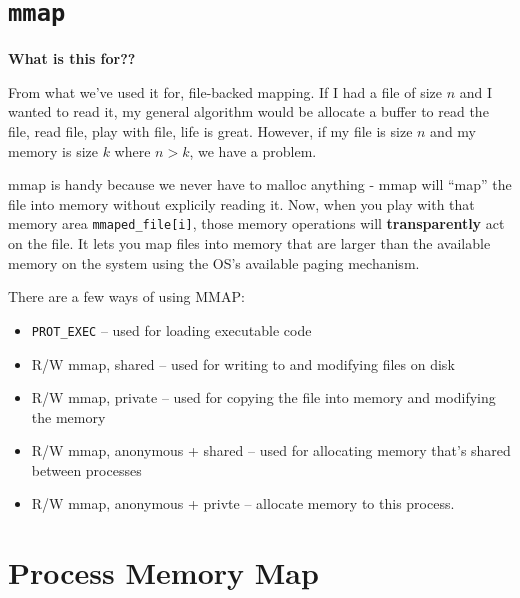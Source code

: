 \section{\texttt{mmap}}

\textbf{What is this for??}

From what we've used it for, file-backed mapping. If I had a file of size $n$
and I wanted to read it, my general algorithm would be allocate a buffer to read
the file, read file, play with file, life is great. However, if my file is size
$n$ and my memory is size $k$ where $n>k$, we have a problem.

mmap is handy because we never have to malloc anything - mmap will ``map'' the
file into memory without explicily reading it. Now, when you play with that
memory area \texttt{mmaped\_file[i]}, those memory operations will
\textbf{transparently} act on the file. It lets you map files into memory that
are larger than the available memory on the system using the OS's available
paging mechanism.


There are a few ways of using MMAP:
\begin{itemize}
\item \texttt{PROT\_EXEC} -- used for loading executable code
\item R/W mmap, shared -- used for writing to and modifying files on disk
\item R/W mmap, private -- used for copying the file into memory and modifying
  the memory
\item R/W mmap, anonymous + shared -- used for allocating memory that's shared
  between processes
\item R/W mmap, anonymous + privte -- allocate memory to this process.
\end{itemize}


\section{Process Memory Map}

